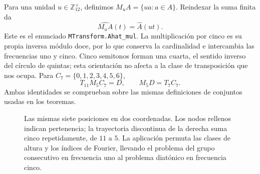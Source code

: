 \documentclass[11pt]{article}
\newcommand{\lean}[1]{\texttt{#1}}
\newcommand{\Ztwelve}{\mathbb{Z}_{12}}
\newcommand{\Ahat}{\widehat A}
\begin{document}
Para una unidad $u\in\Ztwelve^\times$, definimos $M_uA=\{ua:a\in A\}$. Reindexar la suma finita da
\begin{equation}\label{eq:mtransform}
  \widehat{M_uA}(t)=\Ahat(ut).
\end{equation}
Este es el enunciado \lean{MTransform.Ahat\_mul}. La multiplicación por cinco es su propia
inversa módulo doce, por lo que conserva la cardinalidad e intercambia las frecuencias
uno y cinco. Cinco semitonos forman una cuarta, el sentido inverso del círculo de quintas;
esta orientación no afecta a la clase de transposición que nos ocupa.
Para $C_7=\{0,1,2,3,4,5,6\}$,
\[
 T_{11}M_5C_7=D,\qquad M_5D=T_7C_7.
\]
Ambas identidades se comprueban sobre las mismas definiciones de conjuntos usadas en los teoremas.

\begin{figure}[!htb]\centering
{}
\caption{Las mismas siete posiciones en dos coordenadas. Los nodos rellenos indican
pertenencia; la trayectoria discontinua de la derecha suma cinco repetidamente, de $11$
a $5$. La aplicación permuta las clases de altura y los índices de Fourier, llevando
el problema del grupo consecutivo en frecuencia uno al problema diatónico en frecuencia cinco.}
\label{fig:clocks}
\end{figure}
\end{document}
